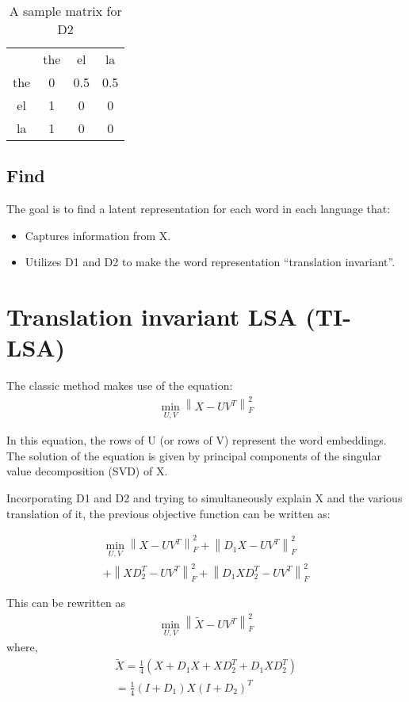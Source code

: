 \documentclass[11pt]{article}
\begin{document}
\begin{table}[h]
\begin{center}
\begin{tabular}{ |c|c|c|c| } 
  \hline
  & the & el & la \\ 
  the & 0 & 0.5 & 0.5 \\ 
  el & 1 & 0 & 0 \\ 
  la & 1 & 0 & 0 \\ 
  \hline
\end{tabular}
\end{center}
\caption{\label{font-table} A sample matrix for D2 }
\end{table}

\subsection{Find}
The goal is to find a latent representation for each word in each language that:
\begin{itemize}
  \item Captures information from X.
  \item Utilizes D1 and D2 to make the word representation “translation invariant”.
\end{itemize}


\section{Translation invariant LSA (TI-LSA)} \label{tilsa}
The classic method makes use of the equation: \begin{multline}\min_{U,V}\left\lVert X - UV^T \right\rVert^{2}_F\end{multline}

In this equation, the rows of U (or rows of V) represent the word embeddings. The solution of the equation is given by principal components of the singular value decomposition (SVD) of X.

Incorporating D1 and D2 and trying to simultaneously explain X and the various translation of it, the previous objective function can be written as:

\begin{multline}
\min_{U,V}\left\lVert X - UV^T \right\rVert^{2}_F + \left\lVert D_{1}X - UV^T \right\rVert^{2}_F \\+ \left\lVert XD^{T}_2 - UV^T \right\rVert^{2}_F + \left\lVert D_{1}XD^{T}_2 - UV^T \right\rVert^{2}_F
\end{multline}

This can be rewritten as \begin{multline}\min_{U,V}\left\lVert \widetilde{X} - UV^T \right\rVert^{2}_F\end{multline} where,
\begin{multline}
\widetilde{X} = \frac{1}{4}(X + D_{1}X + XD^{T}_2 +D_{1}XD^{T}_2 ) \\
= \frac{1}{4}(I + D_{1})X(I + D_2)^{T}
\end{multline}
\end{document}
